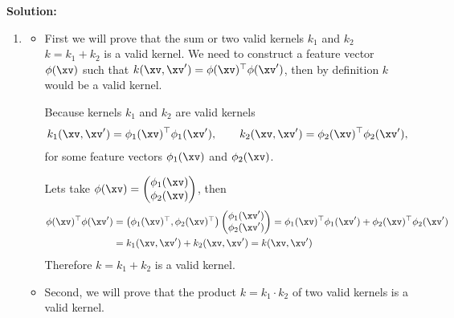 \documentclass{./../../tex_import/ETHuebung_english}
\begin{document}
\textbf{Solution:}
	\begin{enumerate}
		\item 
		\begin{itemize}
			\item 		First we will prove that the sum or two valid kernels $k_1$ and $k_2$ $k = k_1 + k_2$ is a valid kernel. We need to construct a feature vector $\phi(\xv)$ such that $k(\xv, \xv') = \phi(\xv)^\top \phi(\xv')$, then by definition $k$ would be a valid kernel.
			
			Because kernels $k_1$ and $k_2$ are valid kernels
			\begin{align*}
			k_1(\xv, \xv') = \phi_1(\xv)^\top \phi_1(\xv'), \qquad k_2(\xv, \xv') = \phi_2(\xv)^\top \phi_2(\xv'),
			\end{align*}
			for some feature vectors $\phi_1(\xv)$ and $\phi_2(\xv)$.
			
			Lets take $\phi(\xv) = \begin{pmatrix}
			\phi_1(\xv)\\
			\phi_2(\xv)
			\end{pmatrix}$, then
			\begin{align*}
			\phi(\xv)^\top\phi(\xv') &= \begin{pmatrix}\phi_1(\xv)^\top, \phi_2(\xv)^\top \end{pmatrix}\begin{pmatrix}
			\phi_1(\xv')\\
			\phi_2(\xv')
			\end{pmatrix} = \phi_1(\xv)^\top\phi_1(\xv') + \phi_2(\xv)^\top\phi_2(\xv') \\
			&= k_1(\xv, \xv') + k_2(\xv, \xv') = k(\xv, \xv')
			\end{align*}
			Therefore $k = k_1 + k_2$ is a valid kernel.
			
			\item Second, we will prove that the product $k = k_1\cdot k_2$ of two valid kernels is a valid kernel. 
			

\end{itemize}
\end{enumerate}
\end{document}
